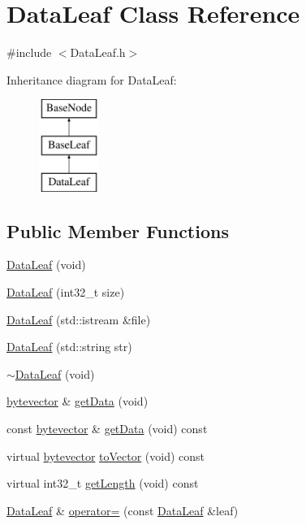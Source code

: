 \hypertarget{class_data_leaf}{\section{Data\-Leaf Class Reference}
\label{class_data_leaf}
}


{\ttfamily \#include $<$Data\-Leaf.\-h$>$}

Inheritance diagram for Data\-Leaf\-:\begin{figure}[H]
\begin{center}
\leavevmode
\includegraphics[height=3.000000cm]{class_data_leaf}
\end{center}
\end{figure}
\subsection*{Public Member Functions}
\begin{DoxyCompactItemize}
\item 
\hyperlink{class_data_leaf_ac9a64badc57c7e8a72b2e437986026a9}{Data\-Leaf} (void)
\item 
\hyperlink{class_data_leaf_a41c683e5c39dd83f26f200ca310d2921}{Data\-Leaf} (int32\-\_\-t size)
\item 
\hyperlink{class_data_leaf_a047de3114cfe3918d11e367ba6d37b2b}{Data\-Leaf} (std\-::istream \&file)
\item 
\hyperlink{class_data_leaf_a40b50e7b1c36769a64ed1166dcaaf1a6}{Data\-Leaf} (std\-::string str)
\item 
\hyperlink{class_data_leaf_a09bb67c6dd0d8841b03b63332416a479}{$\sim$\-Data\-Leaf} (void)
\item 
\hyperlink{types_8h_a64b5be62be31dcda165d2c6c3c262fb5}{bytevector} \& \hyperlink{class_data_leaf_aee63c9d1396d62386e7f22dcbdc1386c}{get\-Data} (void)
\item 
const \hyperlink{types_8h_a64b5be62be31dcda165d2c6c3c262fb5}{bytevector} \& \hyperlink{class_data_leaf_a49a48425860d4ef538b3b9c6ea755a35}{get\-Data} (void) const 
\item 
virtual \hyperlink{types_8h_a64b5be62be31dcda165d2c6c3c262fb5}{bytevector} \hyperlink{class_data_leaf_a62ce63296d298d6ffdc133dafe3b281f}{to\-Vector} (void) const 
\item 
virtual int32\-\_\-t \hyperlink{class_data_leaf_aba4c714ea1dc591023298c50a2e18523}{get\-Length} (void) const 
\item 
\hyperlink{class_data_leaf}{Data\-Leaf} \& \hyperlink{class_data_leaf_a6ea1eda11735b909ae61972a7af919c5}{operator=} (const \hyperlink{class_data_leaf}{Data\-Leaf} \&leaf)
\end{DoxyCompactItemize}
